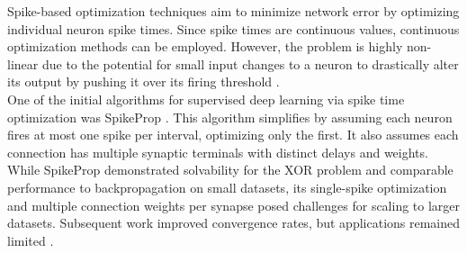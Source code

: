 
\noindent Spike-based optimization techniques aim to minimize network error by optimizing individual neuron spike times. Since spike times are continuous values, continuous optimization methods can be employed. However, the problem is highly non-linear due to the potential for small input changes to a neuron to drastically alter its output by pushing it over its firing threshold \cite{gutig2014spike}.\\




\noindent One of the initial algorithms for supervised deep learning via spike time optimization was SpikeProp \cite{bohte2002error}. This algorithm simplifies by assuming each neuron fires at most one spike per interval, optimizing only the first. It also assumes each connection has multiple synaptic terminals with distinct delays and weights. While SpikeProp demonstrated solvability for the XOR problem and comparable performance to backpropagation on small datasets, its single-spike optimization and multiple connection weights per synapse posed challenges for scaling to larger datasets. Subsequent work \cite{mckennoch2006fast} improved convergence rates, but applications remained limited .\\


